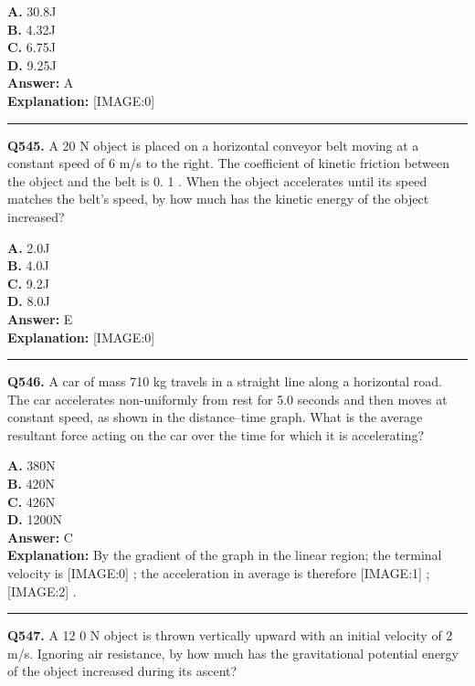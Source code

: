 \documentclass[12pt]{article}
\begin{document}
\textbf{A.} 30.8J \\
\textbf{B.} 4.32J \\
\textbf{C.} 6.75J \\
\textbf{D.} 9.25J \\

\textbf{Answer:} A \\
\textbf{Explanation:} [IMAGE:0]

\hrule
\vspace{1em}


\noindent
\textbf{Q545.} A 20 N object is placed on a horizontal conveyor belt moving at a constant speed of
6
m/s to the right. The coefficient of kinetic friction between the object and the belt is 0.
1
. When the object accelerates until its speed matches the belt's speed, by how much has the kinetic energy of the object increased?



\textbf{A.} 2.0J \\
\textbf{B.} 4.0J \\
\textbf{C.} 9.2J \\
\textbf{D.} 8.0J \\

\textbf{Answer:} E \\
\textbf{Explanation:} [IMAGE:0]

\hrule
\vspace{1em}


\noindent
\textbf{Q546.} A car of mass 710 kg travels in a straight line along a horizontal road.
The car accelerates non-uniformly from rest for 5.0 seconds and then moves at constant speed, as shown in the distance–time graph.
What is the average resultant force acting on the car over the time for which it is accelerating?



\textbf{A.} 380N \\
\textbf{B.} 420N \\
\textbf{C.} 426N \\
\textbf{D.} 1200N \\

\textbf{Answer:} C \\
\textbf{Explanation:} By the gradient of the graph in the linear region; the terminal velocity is
[IMAGE:0]
; the acceleration in average is therefore
[IMAGE:1]
;
[IMAGE:2]
.

\hrule
\vspace{1em}


\noindent
\textbf{Q547.} A
12
0 N object is thrown vertically upward with an initial velocity of 2 m/s. Ignoring air resistance, by how much has the gravitational potential energy of the object increased during its ascent?
\end{document}
